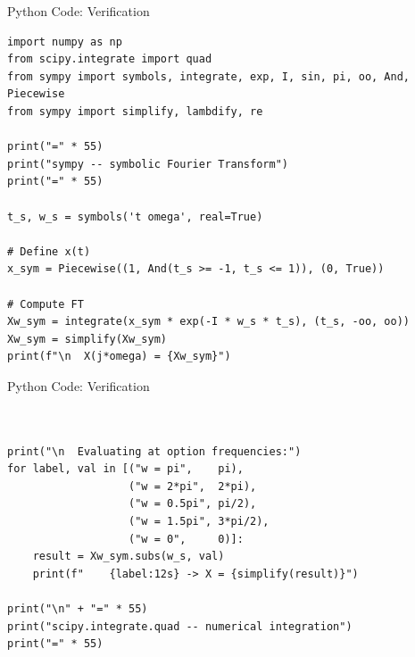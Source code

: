 \documentclass{beamer}
\begin{document}
\begin{frame}[fragile]{Python Code: Verification}


\begin{lstlisting}
import numpy as np
from scipy.integrate import quad
from sympy import symbols, integrate, exp, I, sin, pi, oo, And, Piecewise
from sympy import simplify, lambdify, re

print("=" * 55)
print("sympy -- symbolic Fourier Transform")
print("=" * 55)

t_s, w_s = symbols('t omega', real=True)

# Define x(t) 
x_sym = Piecewise((1, And(t_s >= -1, t_s <= 1)), (0, True))

# Compute FT 
Xw_sym = integrate(x_sym * exp(-I * w_s * t_s), (t_s, -oo, oo))
Xw_sym = simplify(Xw_sym)
print(f"\n  X(j*omega) = {Xw_sym}")
\end{lstlisting}
\end{frame}

\begin{frame}[fragile]{Python Code: Verification}


\begin{lstlisting}


print("\n  Evaluating at option frequencies:")
for label, val in [("w = pi",    pi),
                   ("w = 2*pi",  2*pi),
                   ("w = 0.5pi", pi/2),
                   ("w = 1.5pi", 3*pi/2),
                   ("w = 0",     0)]:
    result = Xw_sym.subs(w_s, val)
    print(f"    {label:12s} -> X = {simplify(result)}")

print("\n" + "=" * 55)
print("scipy.integrate.quad -- numerical integration")
print("=" * 55)

\end{lstlisting}
\end{frame}
\end{document}
